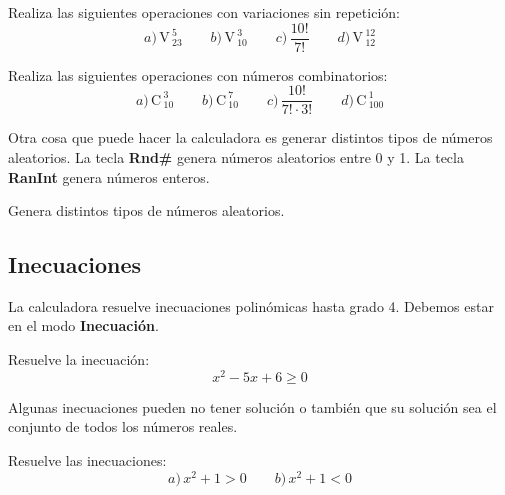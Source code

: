 \documentclass[12pt]{article}
\newenvironment{capitulo}{\begin{tcolorbox}[colback=blue!5!white,colframe=red!75!black]}{\end{tcolorbox}\bigskip}
\newenvironment{ejer}{\begin{tcolorbox}[center title, 
fonttitle=\sffamily\bfseries,colback=blue!5,colframe=orange]}{\end{tcolorbox}}
\begin{document}
\begin{ejer} 
Realiza las siguientes operaciones con variaciones sin repetición:
\[
a)\, \mathrm{V\,}_{23}^5\qquad b)\,\mathrm{V\,}_{10}^3  \qquad c)\, \frac{10!}{7!} \qquad d)\, \mathrm{V\,}_{12}^{12}
\]

\end{ejer}

\begin{ejer}

Realiza las siguientes operaciones con números combinatorios:
\[
a)\,\mathrm{C\,}_{10}^3\qquad b)\,\mathrm{C\,}_{10}^7\qquad c)\, \frac{10!}{7!\cdot 3!}\qquad  d)\,\mathrm{C\,}_{100}^1
\]

\end{ejer}


Otra cosa que puede hacer la calculadora es generar distintos tipos de números aleatorios. La tecla \textbf{Rnd\#} genera números aleatorios entre 0 y 1. La tecla \textbf{RanInt} genera números enteros.

\begin{ejer}

Genera distintos tipos de números aleatorios.

\end{ejer}


\newpage

\begin{capitulo}
\section*{Inecuaciones}
\end{capitulo}

La calculadora resuelve inecuaciones polinómicas hasta grado 4. Debemos estar en el modo \textbf{Inecuación}.

\begin{ejer}

Resuelve la inecuación:
\[
x^2-5x+6 \geq 0
\]

\end{ejer}


Algunas inecuaciones pueden no tener solución o también que su solución sea el conjunto de todos los números reales.

\begin{ejer}

Resuelve las inecuaciones:
\[
a)\, x^2+1 >0 \qquad b)\, x^2+1 <0
\]


\end{ejer}
\end{document}
